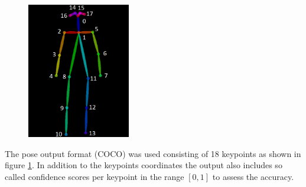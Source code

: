 \begin{figure}[h]
	\centering
	\includegraphics[width=0.4\textwidth]{./images/keypoints_pose_18.png}
	\label{fig:coco}
\end{figure}
The pose output format (COCO) was used consisting of 18 keypoints as shown in figure \ref{fig:coco}. In addition to the keypoints coordinates the output also includes so called confidence scores per keypoint in the range $[0,1]$ to assess the accuracy.

